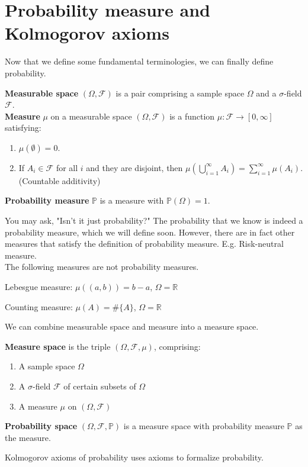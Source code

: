 \documentclass{huhtakm-template-book}
\newcommand{\prob}{\mathbb{P}}
\begin{document}
\section{Probability measure and Kolmogorov axioms}
Now that we define some fundamental terminologies, we can finally define probability.
\begin{defn}
	\textbf{Measurable space} $(\Omega,\mathcal{F})$ is a pair comprising a sample space $\Omega$ and a $\sigma$-field $\mathcal{F}$.\\
	\textbf{Measure} $\mu$ on a measurable space $(\Omega,\mathcal{F})$ is a function $\mu:\mathcal{F}\to [0,\infty]$ satisfying:
	\begin{enumerate}
		\item $\mu(\emptyset)=0$.
		\item If $A_{i}\in\mathcal{F}$ for all $i$ and they are disjoint, then $\mu(\bigcup_{i=1}^{\infty}A_{i})=\sum_{i=1}^{\infty}\mu(A_{i})$. (Countable additivity)
	\end{enumerate}
	\textbf{Probability measure} $\prob$ is a measure with $\prob(\Omega)=1$.
\end{defn}
You may ask, "Isn't it just probability?" The probability that we know is indeed a probability measure, which we will define soon. However, there are in fact other measures that satisfy the definition of probability measure. E.g. Risk-neutral measure.\\
The following measures are not probability measures.
\begin{eg}
	Lebesgue measure: $\mu((a,b))=b-a$, $\Omega=\mathbb{R}$
\end{eg}
\begin{eg}
	Counting measure: $\mu(A)=\#\{A\}$, $\Omega=\mathbb{R}$
\end{eg}
We can combine measurable space and measure into a measure space.
\begin{defn}
	\textbf{Measure space} is the triple $(\Omega,\mathcal{F},\mu)$, comprising:
	\begin{enumerate}
		\item A sample space $\Omega$
		\item A $\sigma$-field $\mathcal{F}$ of certain subsets of $\Omega$
		\item A measure $\mu$ on $(\Omega,\mathcal{F})$
	\end{enumerate}
	\textbf{Probability space} $(\Omega,\mathcal{F},\prob)$ is a measure space with probability measure $\prob$ as the measure.
\end{defn}
Kolmogorov axioms of probability uses axioms to formalize probability.
\end{document}
